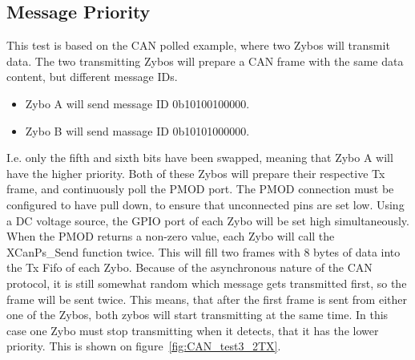 \subsection{Message Priority}\label{sub:CAN_message priority}
This test is based on the CAN polled example, where two Zybos will transmit data.
The two transmitting Zybos will prepare a CAN frame with the same data content, but different message IDs.
\begin{itemize}
	\item Zybo A will send message ID 0b10100100000.
	\item Zybo B will send massage ID 0b10101000000.
\end{itemize}
I.e. only the fifth and sixth bits have been swapped, meaning that Zybo A will have the higher priority.
Both of these Zybos will prepare their respective Tx frame, and continuously poll the PMOD port.
The PMOD connection must be configured to have pull down, to ensure that unconnected pins are set low.
Using a DC voltage source, the GPIO port of each Zybo will be set high simultaneously.\\

When the PMOD returns a non-zero value, each Zybo will call the XCanPs\_Send function twice.
This will fill two frames with 8 bytes of data into the Tx Fifo of each Zybo. 
Because of the asynchronous nature of the CAN protocol, it is still somewhat random which message gets transmitted first, so the frame will be sent twice. 
This means, that after the first frame is sent from either one of the Zybos, both zybos will start transmitting at the same time. 
In this case one Zybo must stop transmitting when it detects, that it has the lower priority.
This is shown on figure~\ref{fig:CAN_test3_2TX}.\\

